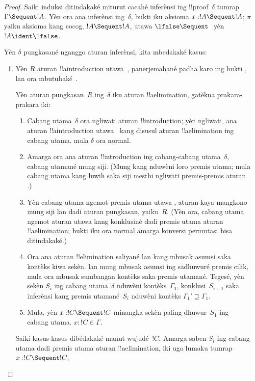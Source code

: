 \documentclass[../../../include/open-logic-section]{subfiles}
\begin{document}
\begin{proof}
Saiki induksi ditindakaké miturut cacahé inferènsi ing
!!{proof}~$\delta$ tumrap $\Gamma \Sequent !A$. Yèn ora ana
inferènsi ing~$\delta$, bukti iku aksioma
$x:!A \Sequent !A$; $\pi$ yaiku aksioma kang cocog,
$!A \Sequent !A$, utawa $\lfalse \Sequent \ $ yèn
$!A \ident \lfalse$.

Yèn $\delta$ pungkasané nganggo aturan inferènsi, kita mbedakaké kasus:
\begin{enumerate}
  \item Yèn $R$ aturan !!a{introduction} utawa~\FalseInt,
  panerjemahané padha karo ing bukti
  , lan ora mbutuhaké~\Cut.

  Yèn aturan pungkasan~$R$ ing~$\delta$ iku aturan
  !!a{elimination}, gatèkna prakara-prakara iki:
  \begin{enumerate}
    \item Cabang utama~$\delta$ ora ngliwati aturan
    !!{introduction}; yèn ngliwati, ana aturan
    !!a{introduction} utawa~\FalseInt{} kang disusul aturan
    !!a{elimination} ing cabang utama, mula $\delta$ ora normal.
    \item Amarga ora ana aturan !!{introduction} ing cabang-cabang
    utama~$\delta$, cabang utamané mung siji. (Mung
    \Intro{\land} kang nduwèni loro premis utama; mula cabang
    utama kang luwih saka siji mesthi ngliwati premis-premis
    aturan \Intro{\land}.)
    \item Yèn cabang utama ngemot premis utama \Elim{\lor}
    utawa \Elim{\lexists}, aturan kaya mangkono mung siji lan
    dadi aturan pungkasan, yaiku~$R$. (Yèn ora, cabang utama
    ngemot aturan \Elim{\lor} utawa \Elim{\lexists} kang
    konklusiné dadi premis utama aturan !!a{elimination};
    bukti iku ora normal amarga konversi permutasi bisa
    ditindakaké.)
  \item Ora ana aturan !!{elimination} saliyané \Elim{\lor}
  lan \Elim{\lexists} kang mbusak asumsi saka kontèks kiwa sekèn. \Elim{\lor} lan \Elim{\lexists}
  mung mbusak asumsi ing
  sadhuwuré premis cilik, mula ora mbusak sumbangan kontèks saka
  premis utamané. Tegesé, yèn sekèn $S_i$ ing cabang
  utama~$\delta$ nduwèni kontèks~$\Gamma_1$, konklusi~$S_{i+1}$
  saka inferènsi kang premis utamané~$S_i$ nduwèni kontèks
  $\Gamma_1' \supseteq \Gamma_1$.
  \item Mula, yèn $x: !C \Sequent !C$ minangka sekèn
  paling dhuwur~$S_1$ ing cabang utama, $x:!C \in \Gamma$.
  \end{enumerate}
  Saiki kasus-kasus dibédakaké manut wujudé~$!C$. Amarga saben
  $S_i$ ing cabang utama dadi premis utama aturan
  !!a{elimination}, iki uga lumaku tumrap $x:!C \Sequent !C$.


\end{enumerate}
\end{proof}
\end{document}
